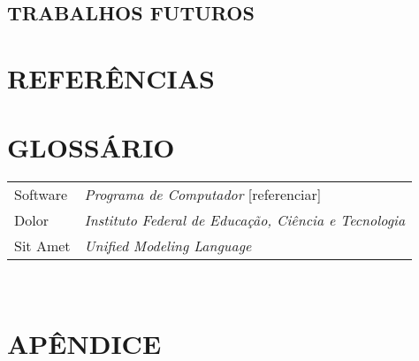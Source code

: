 \documentclass[12pt,a4paper]{article}
\begin{document}
	\lipsum[1]

		\subsection{TRABALHOS FUTUROS}

			\lipsum[1]

	\newpage


	\section*{REFERÊNCIAS}

	\printbibliography[heading=none]

	\newpage

	\section*{GLOSSÁRIO}

	\begin{tabular}{p{3cm} p{}}
	  Software & \textit{Programa de Computador} [referenciar] \\
	  Dolor & \textit{Instituto Federal de Educação, Ciência e Tecnologia} \\
	  Sit Amet & \textit{Unified Modeling Language} \\
	\end{tabular}\\


	\newpage

	\section*{APÊNDICE}

	\lipsum[1]

	\newpage
\end{document}
